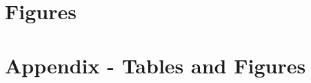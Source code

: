 \documentclass[11pt]{article}
\begin{document}

\pagebreak
\section*{Figures}

\pagebreak
\section{Appendix - Tables and Figures}
\end{document}
